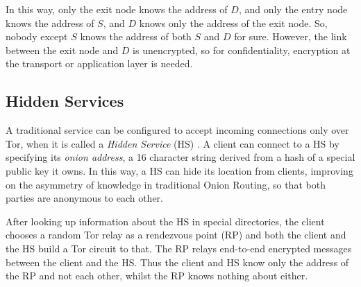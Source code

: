 \documentclass[diss.tex]{subfiles}
\begin{document}
\begin{figure}[H]
\centering
{}
\end{figure}

In this way, only the exit node knows the address of $D$, and only the entry node knows the address of $S$, and $D$ knows only the address of the exit node. So, nobody except $S$ knows the address of both $S$ and $D$ for sure. However, the link between the exit node and $D$ is unencrypted, so for confidentiality, encryption at the transport or application layer is needed.
\subsection{Hidden Services}
A traditional service can be configured to accept incoming connections only over Tor, when it is called a \textit{Hidden Service} (HS) \cite{hiddenservice}. A client can connect to a HS by specifying its \textit{onion address}, a 16 character string derived from a hash of a special public key it owns. In this way, a HS can hide its location from clients, improving on the asymmetry of knowledge in traditional Onion Routing, so that both parties are anonymous to each other. 

After looking up information about the HS in special directories, the client chooses a random Tor relay as a rendezvous point (RP) and both the client and the HS build a Tor circuit to that. The RP relays end-to-end encrypted messages between the client and the HS. Thus the client and HS know only the address of the RP and not each other, whilst the RP knows nothing about either.
\end{document}
